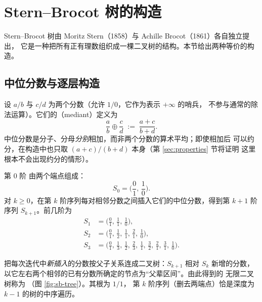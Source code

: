 \section{Stern--Brocot 树的构造}\label{sec:construction}

Stern--Brocot 树由 Moritz Stern（1858）与 Achille Brocot（1861）各自独立提出，
它是一种把所有正有理数组织成一棵二叉树的结构。本节给出两种等价的构造。

\subsection{中位分数与逐层构造}

\begin{definition}[中位分数]
设 $a/b$ 与 $c/d$ 为两个分数（允许 $1/0$，它作为表示 $+\infty$ 的哨兵，
不参与通常的除法运算）。它们的（mediant）定义为
\[
  \frac{a}{b}\oplus\frac{c}{d}\;:=\;\frac{a+c}{b+d}.
\]
中位分数是分子、分母\emph{分别}相加，而非两个分数的算术平均；即使相加后
可以约分，在构造中也只取 $(a+c)/(b+d)$ 本身（第 \ref{sec:properties} 节将证明
这里根本不会出现约分的情形）。
\end{definition}

\begin{definition}
第 $0$ 阶 由两个端点组成：
\[
  S_0=\Big(\frac01,\,\frac10\Big).
\]
对 $k\ge 0$，在第 $k$ 阶序列每对相邻分数之间插入它们的中位分数，得到第 $k+1$
阶序列 $S_{k+1}$。前几阶为
\[
\begin{aligned}
  S_1&=\Big(\frac01,\,\frac11,\,\frac10\Big),\\
  S_2&=\Big(\frac01,\,\frac12,\,\frac11,\,\frac21,\,\frac10\Big),\\
  S_3&=\Big(\frac01,\,\frac13,\,\frac12,\,\frac23,\,\frac11,\,\frac32,\,
            \frac21,\,\frac31,\,\frac10\Big).
\end{aligned}
\]
\end{definition}

把每次迭代中\emph{新插入}的分数按父子关系连成二叉树：$S_{k+1}$ 相对 $S_k$
新增的分数，以它左右两个相邻的已有分数所确定的节点为``父辈区间''。由此得到的
无限二叉树称为 （图 \ref{fig:sb-tree}）。其根为 $1/1$，
第 $k$ 阶序列（删去两端点）恰是深度为 $k-1$ 的树的中序遍历。

